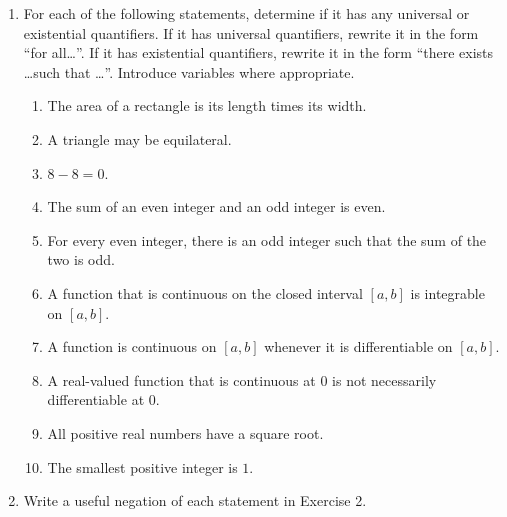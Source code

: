 \documentclass[12pt]{article}
\begin{document}
\begin{enumerate}
\item For each of the following statements, determine if it has any universal or existential quantifiers.  If it has
  universal quantifiers, rewrite it in the form ``for all\ldots''.
  If it has existential quantifiers, rewrite it in the form ``there exists \ldots such that \ldots''.
  Introduce variables where appropriate.\vspace{-8pt}
 \begin{enumerate}
  \item The area of a rectangle is its length times its width.\vspace{-2pt}
  \item A triangle may be equilateral.\vspace{-2pt}
  \item $8-8=0$.\vspace{-2pt}
  \item The sum of an even integer and an odd integer is even.\vspace{-2pt}
  \item For every even integer, there is an odd integer such that the sum of the two is odd.\vspace{-2pt}
  \item A function that is continuous on the closed interval $[a,b]$ is integrable on $[a,b]$.\vspace{-2pt}
  \item A function is continuous on $[a,b]$ whenever it is differentiable on $[a,b]$.\vspace{-2pt}
  \item A real-valued function that is continuous at $0$ is not necessarily differentiable at $0$.\vspace{-2pt}
  \item All positive real numbers have a square root.\vspace{-2pt}
  \item The smallest positive integer is $1$.\vspace{-2pt}
 \end{enumerate} 

\item Write a useful negation of each statement in Exercise 2.


\end{enumerate}
\end{document}
